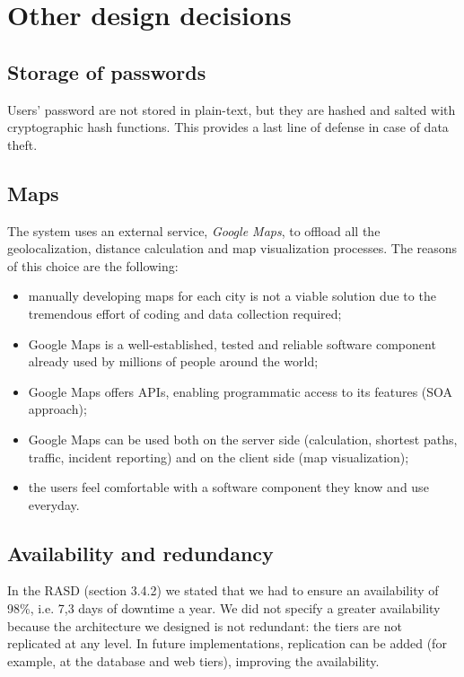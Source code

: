 \section{Other design decisions}
\label{sec:other-design-decisions}

\subsection{Storage of passwords}
Users' password are not stored in plain-text, but they are hashed and salted with cryptographic hash functions. This provides a last line of defense in case of data theft.

\subsection{Maps}
The system uses an external service, \emph{Google Maps}, to offload all the geolocalization, distance calculation and map visualization processes. The reasons of this choice are the following:
\begin{itemize}
    \item manually developing maps for each city is not a viable solution due to the tremendous effort of coding and data collection required;
    \item Google Maps is a well-established, tested and reliable software component already used by millions of people around the world;
    \item Google Maps offers APIs, enabling programmatic access to its features (SOA approach);
    \item Google Maps can be used both on the server side (calculation, shortest paths, traffic, incident reporting) and on the client side (map visualization);
    \item the users feel comfortable with a software component they know and use everyday.
\end{itemize}

\subsection{Availability and redundancy}
In the RASD (section 3.4.2) we stated that we had to ensure an availability of 98\%, i.e. 7,3 days of downtime a year.
We did not specify a greater availability because the architecture we designed is not redundant: the tiers are not replicated at any level.
In future implementations, replication can be added (for example, at the database and web tiers), improving the availability.
